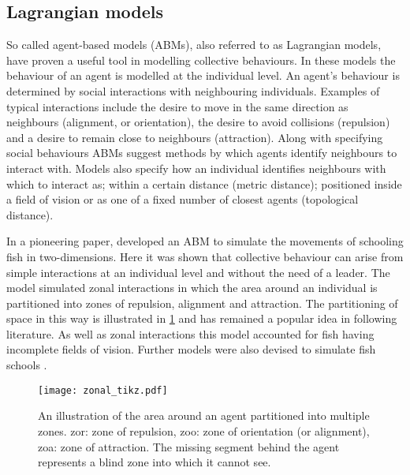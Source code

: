 \subsection{Lagrangian models}
\label{ssec:lagrangian_models}

So called agent-based models (ABMs), also referred to as Lagrangian models, have proven a useful tool in modelling collective behaviours. In these models the behaviour of an agent is modelled at the individual level. An agent's behaviour is determined by social interactions with neighbouring individuals. Examples of typical interactions include the desire to move in the same direction as neighbours (alignment, or orientation), the desire to avoid collisions (repulsion) and a desire to remain close to neighbours (attraction). Along with specifying social behaviours ABMs suggest methods by which agents identify neighbours to interact with. Models also specify how an individual identifies neighbours with which to interact as; within a certain distance (metric distance); positioned inside a field of vision or as one of a fixed number of closest agents (topological distance).

In a pioneering paper, \citet{aoki82} developed an ABM to simulate the movements of schooling fish in two-dimensions. Here it was shown that collective behaviour can arise from simple interactions at an individual level and without the need of a leader. The model simulated zonal interactions in which the area around an individual is partitioned into zones of repulsion, alignment and attraction. The partitioning of space in this way is illustrated in \cref{fig:zone_illustration} and has remained a popular idea in following literature. As well as zonal interactions this model accounted for fish having incomplete fields of vision. Further models were also devised to simulate fish schools \citep{okubo86, huth92}.

\begin{figure}[t]
	\texttt{[image: zonal\_tikz.pdf]}
	\caption{An illustration of the area around an agent partitioned into multiple zones. zor: zone of repulsion, zoo: zone of orientation (or alignment), zoa: zone of attraction. The missing segment behind the agent represents a blind zone into which it cannot see.}
	\label{fig:zone_illustration}
\end{figure}

